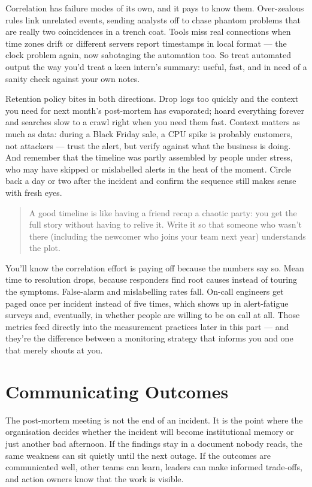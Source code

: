 Correlation has failure modes of its own, and it pays to know them. Over-zealous rules link unrelated events, sending analysts off to chase phantom problems that are really two coincidences in a trench coat. Tools miss real connections when time zones drift or different servers report timestamps in local format — the clock problem again, now sabotaging the automation too. So treat automated output the way you'd treat a keen intern's summary: useful, fast, and in need of a sanity check against your own notes.


Retention policy bites in both directions. Drop logs too quickly and the context you need for next month's post-mortem has evaporated; hoard everything forever and searches slow to a crawl right when you need them fast. Context matters as much as data: during a Black Friday sale, a CPU spike is probably customers, not attackers — trust the alert, but verify against what the business is doing. And remember that the timeline was partly assembled by people under stress, who may have skipped or mislabelled alerts in the heat of the moment. Circle back a day or two after the incident and confirm the sequence still makes sense with fresh eyes.



\begin{quote}\small
A good timeline is like having a friend recap a chaotic party: you get the full story without having to relive it. Write it so that someone who wasn't there (including the newcomer who joins your team next year) understands the plot.
\end{quote}


You'll know the correlation effort is paying off because the numbers say so. Mean time to resolution drops, because responders find root causes instead of touring the symptoms. False-alarm and mislabelling rates fall. On-call engineers get paged once per incident instead of five times, which shows up in alert-fatigue surveys and, eventually, in whether people are willing to be on call at all. Those metrics feed directly into the measurement practices later in this part — and they're the difference between a monitoring strategy that informs you and one that merely shouts at you.

\section{Communicating Outcomes}
The post-mortem meeting is not the end of an incident. It is the point where the organisation decides whether the incident will become institutional memory or just another bad afternoon. If the findings stay in a document nobody reads, the same weakness can sit quietly until the next outage. If the outcomes are communicated well, other teams can learn, leaders can make informed trade-offs, and action owners know that the work is visible.


